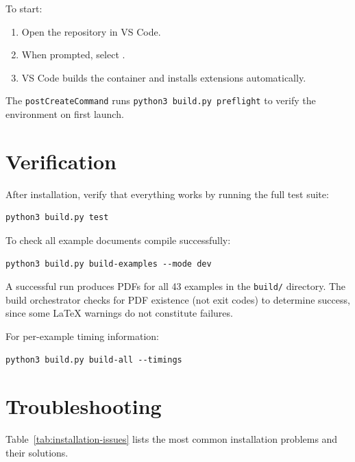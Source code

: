 To start:

\begin{enumerate}
    \item Open the repository in VS Code.
    \item When prompted, select .
    \item VS Code builds the container and installs extensions automatically.
\end{enumerate}

The \texttt{postCreateCommand} runs \texttt{python3 build.py preflight} to
verify the environment on first launch.

\section{Verification}

After installation, verify that everything works by running the full test
suite:

\begin{verbatim}
python3 build.py test
\end{verbatim}

To check all example documents compile successfully:

\begin{verbatim}
python3 build.py build-examples --mode dev
\end{verbatim}

A successful run produces PDFs for all 43 examples in the \texttt{build/}
directory.  The build orchestrator checks for PDF existence (not exit codes) to
determine success, since some \LaTeX{} warnings do not constitute failures.

For per-example timing information:

\begin{verbatim}
python3 build.py build-all --timings
\end{verbatim}

\section{Troubleshooting}
\label{sec:installation-troubleshooting}

Table~\ref{tab:installation-issues} lists the most common installation
problems and their solutions.

